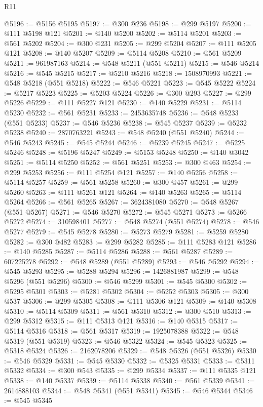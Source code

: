 \begin{lexlean}{R11}
\begin{coremodule}
@5196 := @5156 @5195
@5197 := @300 @236
@5198 := @299 @5197
@5200 := @111 @5198 @121
@5201 := @140 @5200
@5202 := @5114 @5201
@5203 := @561 @5202
@5204 := @300 @231
@5205 := @299 @5204
@5207 := @111 @5205 @121
@5208 := @140 @5207
@5209 := @5114 @5208
@5210 := @561 @5209
@5211 := 961987163
@5214 := @548 @5211 (@551 @5211)
@5215 := @546 @5214
@5216 := @545 @5215
@5217 := @5210 @5216
@5218 := 1508970993
@5221 := @548 @5218 (@551 @5218)
@5222 := @546 @5221
@5223 := @545 @5222
@5224 := @5217 @5223
@5225 := @5203 @5224
@5226 := @300 @293
@5227 := @299 @5226
@5229 := @111 @5227 @121
@5230 := @140 @5229
@5231 := @5114 @5230
@5232 := @561 @5231
@5233 := 2453635748
@5236 := @548 @5233 (@551 @5233)
@5237 := @546 @5236
@5238 := @545 @5237
@5239 := @5232 @5238
@5240 := 2870763221
@5243 := @548 @5240 (@551 @5240)
@5244 := @546 @5243
@5245 := @545 @5244
@5246 := @5239 @5245
@5247 := @5225 @5246
@5248 := @5196 @5247
@5249 := @5153 @5248
@5250 := @140 @3042
@5251 := @5114 @5250
@5252 := @561 @5251
@5253 := @300 @463
@5254 := @299 @5253
@5256 := @111 @5254 @121
@5257 := @140 @5256
@5258 := @5114 @5257
@5259 := @561 @5258
@5260 := @300 @457
@5261 := @299 @5260
@5263 := @111 @5261 @121
@5264 := @140 @5263
@5265 := @5114 @5264
@5266 := @561 @5265
@5267 := 3624381080
@5270 := @548 @5267 (@551 @5267)
@5271 := @546 @5270
@5272 := @545 @5271
@5273 := @5266 @5272
@5274 := 310598401
@5277 := @548 @5274 (@551 @5274)
@5278 := @546 @5277
@5279 := @545 @5278
@5280 := @5273 @5279
@5281 := @5259 @5280
@5282 := @300 @482
@5283 := @299 @5282
@5285 := @111 @5283 @121
@5286 := @140 @5285
@5287 := @5114 @5286
@5288 := @561 @5287
@5289 := 607225278
@5292 := @548 @5289 (@551 @5289)
@5293 := @546 @5292
@5294 := @545 @5293
@5295 := @5288 @5294
@5296 := 1426881987
@5299 := @548 @5296 (@551 @5296)
@5300 := @546 @5299
@5301 := @545 @5300
@5302 := @5295 @5301
@5303 := @5281 @5302
@5304 := @5252 @5303
@5305 := @300 @537
@5306 := @299 @5305
@5308 := @111 @5306 @121
@5309 := @140 @5308
@5310 := @5114 @5309
@5311 := @561 @5310
@5312 := @300 @510
@5313 := @299 @5312
@5315 := @111 @5313 @121
@5316 := @140 @5315
@5317 := @5114 @5316
@5318 := @561 @5317
@5319 := 1925078388
@5322 := @548 @5319 (@551 @5319)
@5323 := @546 @5322
@5324 := @545 @5323
@5325 := @5318 @5324
@5326 := 2162078206
@5329 := @548 @5326 (@551 @5326)
@5330 := @546 @5329
@5331 := @545 @5330
@5332 := @5325 @5331
@5333 := @5311 @5332
@5334 := @300 @543
@5335 := @299 @5334
@5337 := @111 @5335 @121
@5338 := @140 @5337
@5339 := @5114 @5338
@5340 := @561 @5339
@5341 := 2614888103
@5344 := @548 @5341 (@551 @5341)
@5345 := @546 @5344
@5346 := @545 @5345

\end{coremodule}
\end{lexlean}
